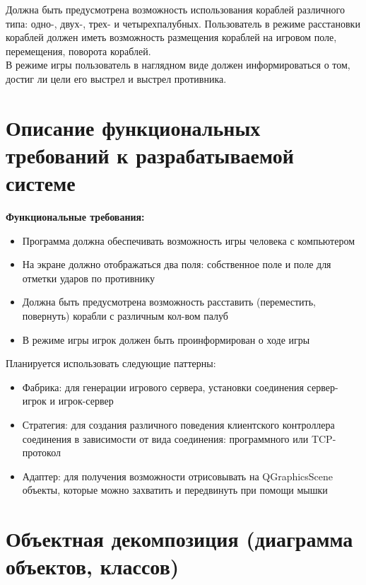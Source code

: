 \documentclass[a4paper,14pt]{extarticle}
\begin{document}
Должна быть предусмотрена возможность использования кораблей различного типа:
одно-, двух-, трех- и четырехпалубных. Пользователь в режиме
расстановки кораблей должен иметь возможность размещения
кораблей на игровом поле, перемещения, поворота
кораблей. \\

В режиме игры пользователь в наглядном виде должен
информироваться о том, достиг ли цели его выстрел и выстрел
противника.\bigbreak

\newpage

\section{Описание функциональных требований к разрабатываемой системе}
\textbf{Функциональные требования: }
\begin{itemize}
    \item Программа должна обеспечивать возможность игры человека с компьютером
    \item На экране должно отображаться два поля: собственное поле и поле для отметки ударов по противнику
    \item Должна быть предусмотрена возможность расставить (переместить, повернуть) корабли с различным кол-вом палуб
    \item В режиме игры игрок должен быть проинформирован о ходе игры
\end{itemize}
Планируется использовать следующие паттерны:
\begin{itemize}
    \item Фабрика: для генерации игрового сервера, установки соединения сервер-игрок и игрок-сервер
    \item Стратегия: для создания различного поведения клиентского контроллера соединения в зависимости от вида соединения: программного или TCP-протокол
    \item Адаптер: для получения возможности отрисовывать на QGraphicsScene объекты, которые можно захватить и передвинуть при помощи мышки
\end{itemize}
\newpage
\section{Объектная декомпозиция (диаграмма объектов, классов)}
\end{document}
